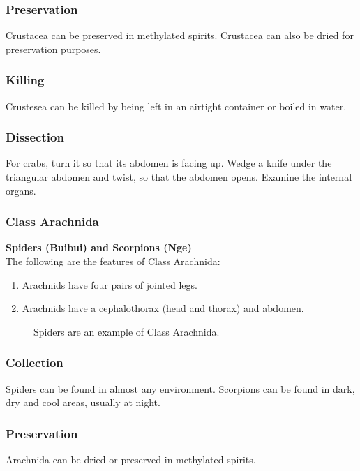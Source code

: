 \subsubsection{Preservation} 
Crustacea can be preserved in methylated spirits. Crustacea can also be dried for preservation purposes.

\subsubsection{Killing}
Crustesea can be killed by being left in an airtight container or boiled in water.

\subsubsection{Dissection}
For crabs, turn it so that its abdomen is facing up. Wedge a knife under the triangular abdomen and twist, so that the abdomen opens. Examine the internal organs.
		
\subsubsection{Class Arachnida}
\textbf{Spiders (Buibui) and Scorpions (Nge)}\\
The following are the features of Class Arachnida:
\begin{enumerate}
\item{Arachnids have four pairs of jointed legs.}
\item{Arachnids have a cephalothorax (head and thorax) and abdomen.}
\end{enumerate}

\begin{figure}[h]
\begin{center}
\def\svgwidth{6cm}

\caption{Spiders are an example of Class Arachnida.}
\label{fig:fish}
\end{center}
\end{figure}

\subsubsection{Collection}
Spiders can be found in almost any environment. Scorpions can be found in dark, dry and cool areas, usually at night.

\subsubsection{Preservation} 
Arachnida can be dried or preserved in methylated spirits.

